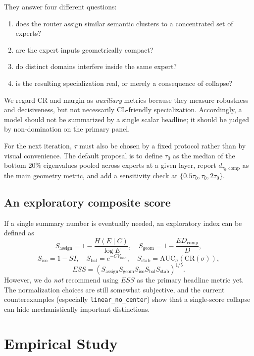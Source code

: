 \documentclass[11pt]{article}
\newcommand{\idea}[1]{\textcolor{red}{[#1]}}
\begin{document}
They answer four different questions:
\begin{enumerate}
    \item does the router assign similar semantic clusters to a concentrated set of experts?
    \item are the expert inputs geometrically compact?
    \item do distinct domains interfere inside the same expert?
    \item is the resulting specialization real, or merely a consequence of collapse?
\end{enumerate}
We regard CR and margin as \emph{auxiliary} metrics because they measure robustness and decisiveness, but not necessarily CL-friendly specialization. Accordingly, a model should not be summarized by a single scalar headline; it should be judged by non-domination on the primary panel.

For the next iteration, $\tau$ must also be chosen by a fixed protocol rather than by visual convenience. The default proposal is to define $\tau_0$ as the median of the bottom 20\% eigenvalues pooled across experts at a given layer, report $d_{\tau_0,\mathrm{comp}}$ as the main geometry metric, and add a sensitivity check at $\{0.5\tau_0,\tau_0,2\tau_0\}$.

\subsection{An exploratory composite score}
If a single summary number is eventually needed, an exploratory index can be defined as
\[
S_{\mathrm{assign}} = 1-\frac{H(E\mid C)}{\log E},
\quad
S_{\mathrm{geom}} = 1-\frac{ED_{\mathrm{comp}}}{D},
\]
\[
S_{\mathrm{iso}} = 1-SI,
\quad
S_{\mathrm{bal}} = e^{-CV_{\mathrm{load}}},
\quad
S_{\mathrm{stab}} = \mathrm{AUC}_{\sigma}(\mathrm{CR}(\sigma)),
\]
\[
ESS =
\left(
S_{\mathrm{assign}}
S_{\mathrm{geom}}
S_{\mathrm{iso}}
S_{\mathrm{bal}}
S_{\mathrm{stab}}
\right)^{1/5}.
\]
However, we do \emph{not} recommend using $ESS$ as the primary headline metric yet. The normalization choices are still somewhat subjective, and the current counterexamples (especially \texttt{linear\_no\_center}) show that a single-score collapse can hide mechanistically important distinctions.

\section{Empirical Study}

\end{document}
